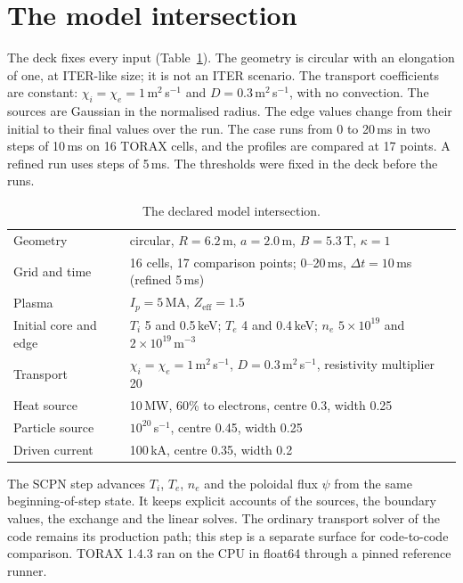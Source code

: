 \documentclass[11pt]{article}
\begin{document}
\section{The model intersection}

The deck fixes every input (Table~\ref{tab:deck}).  The geometry is circular
with an elongation of one, at ITER-like size; it is not an ITER scenario.  The
transport coefficients are constant: $\chi_i = \chi_e = 1$\,m$^2$\,s$^{-1}$ and
$D = 0.3$\,m$^2$\,s$^{-1}$, with no convection.  The sources are Gaussian in
the normalised radius.  The edge values change from their initial to their final values over the run.  The case
runs from 0 to 20\,ms in two steps of 10\,ms on 16 TORAX cells, and the
profiles are compared at 17 points.  A refined run uses steps of 5\,ms.  The
thresholds were fixed in the deck before the runs.

\begin{table}[ht]
\centering
\caption{The declared model intersection.}
\label{tab:deck}
\small
\begin{tabular}{ll}
\toprule
Geometry & circular, $R = 6.2$\,m, $a = 2.0$\,m, $B = 5.3$\,T, $\kappa = 1$ \\
Grid and time & 16 cells, 17 comparison points; 0--20\,ms, $\Delta t = 10$\,ms (refined 5\,ms) \\
Plasma & $I_p = 5$\,MA, $Z_\mathrm{eff} = 1.5$ \\
Initial core and edge & $T_i$ 5 and 0.5\,keV; $T_e$ 4 and 0.4\,keV; $n_e$ $5 \times 10^{19}$ and $2 \times 10^{19}$\,m$^{-3}$ \\
Transport & $\chi_i = \chi_e = 1$\,m$^2$\,s$^{-1}$, $D = 0.3$\,m$^2$\,s$^{-1}$, resistivity multiplier 20 \\
Heat source & 10\,MW, 60\% to electrons, centre 0.3, width 0.25 \\
Particle source & $10^{20}$\,s$^{-1}$, centre 0.45, width 0.25 \\
Driven current & 100\,kA, centre 0.35, width 0.2 \\
\bottomrule
\end{tabular}
\end{table}

The SCPN step advances $T_i$, $T_e$, $n_e$ and the poloidal flux $\psi$ from
the same beginning-of-step state.  It keeps explicit accounts of the sources,
the boundary values, the exchange and the linear solves.  The ordinary
transport solver of the code remains its production path; this step is a
separate surface for code-to-code comparison.  TORAX 1.4.3 ran on the CPU in
float64 through a pinned reference runner.
\end{document}
